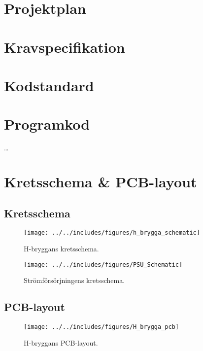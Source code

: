 \appendix
\section{Projektplan}


\section{Kravspecifikation}


\section{Kodstandard}



\section{Programkod}
\ldots

\section{Kretsschema \& PCB-layout}
\subsection{Kretsschema}
\begin{landscape}
\begin{figure}[htbp!]
\centering
\texttt{[image: ../../includes/figures/h\_brygga\_schematic]}
\caption{H-bryggans kretsschema.}
\label{fig:appendix_h_brygga_schema}
\end{figure}
\end{landscape}

\begin{landscape}
\begin{figure}[htbp!]
\centering
\texttt{[image: ../../includes/figures/PSU\_Schematic]}
\caption{Strömförsörjningens kretsschema.}
\label{fig:appendix_PSU_schema}
\end{figure}
\end{landscape}

\subsection{PCB-layout}
\begin{figure}[htbp!]
\centering
\texttt{[image: ../../includes/figures/H\_brygga\_pcb]}
\caption{H-bryggans PCB-layout.}
\label{fig:appendix_pcb_layout}
\end{figure}

